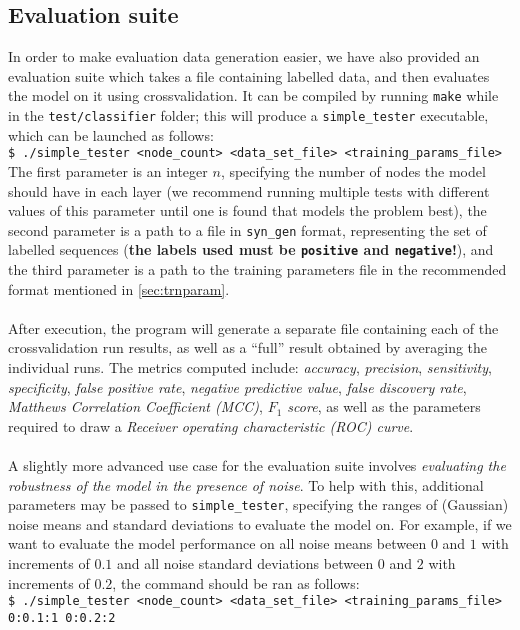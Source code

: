 \documentclass[12pt]{article}
\newcommand{\shellcmd}[1]{\\\indent\indent\texttt{\footnotesize\$ #1}}
\begin{document}
	\subsection{Evaluation suite}
	In order to make evaluation data generation easier, we have also provided an evaluation suite which takes a file containing labelled data, and then evaluates the model on it using crossvalidation. It can be compiled by running {\tt make} while in the {\tt test/classifier} folder; this will produce a {\tt simple\_tester} executable, which can be launched as follows:
	\shellcmd{./simple\_tester <node\_count> <data\_set\_file> <training\_params\_file>}\\
	The first parameter is an integer $n$, specifying the number of nodes the model should have in each layer (we recommend running multiple tests with different values of this parameter until one is found that models the problem best), the second parameter is a path to a file in {\tt syn\_gen} format, representing the set of labelled sequences (\textbf{the labels used must be {\tt positive} and {\tt negative}!}), and the third parameter is a path to the training parameters file in the recommended format mentioned in \cref{sec:trnparam}.\\ \\
	After execution, the program will generate a separate file containing each of the crossvalidation run results, as well as a ``full'' result obtained by averaging the individual runs. The metrics computed include: \emph{accuracy}, \emph{precision}, \emph{sensitivity}, \emph{specificity}, \emph{false positive rate}, \emph{negative predictive value}, \emph{false discovery rate}, \emph{Matthews Correlation Coefficient (MCC)}, \emph{$F_1$ score}, as well as the parameters required to draw a \emph{Receiver operating characteristic (ROC) curve}.\\ \\
	A slightly more advanced use case for the evaluation suite involves \emph{evaluating the robustness of the model in the presence of noise}. To help with this, additional parameters may be passed to {\tt simple\_tester}, specifying the ranges of (Gaussian) noise means and standard deviations to evaluate the model on. For example, if we want to evaluate the model performance on all noise means between $0$ and $1$ with increments of $0.1$ and all noise standard deviations between $0$ and $2$ with increments of $0.2$, the command should be ran as follows:
	\shellcmd{./simple\_tester <node\_count> <data\_set\_file> <training\_params\_file> 0:0.1:1 0:0.2:2}
\end{document}
